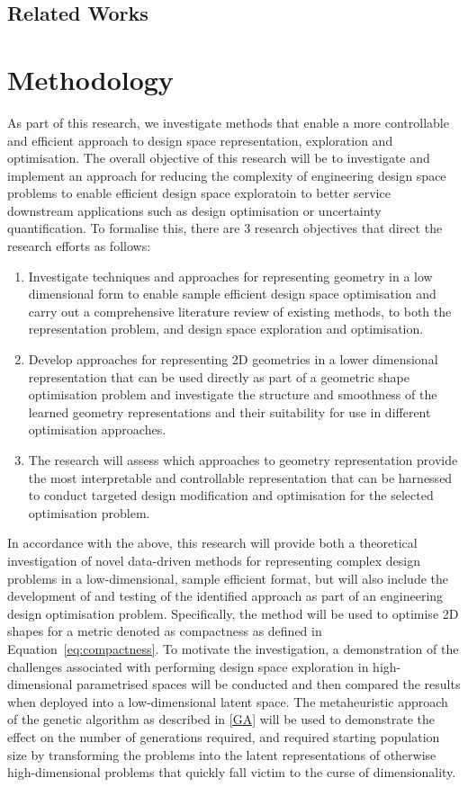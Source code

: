\documentclass{article}
\begin{document}
\subsection{Related Works}

\newpage

\section{Methodology}
As part of this research, we investigate methods that enable a more controllable and efficient approach to design space representation, exploration and optimisation. The overall objective of this research will be to investigate and implement an approach for reducing the complexity of engineering design space problems to enable efficient design space exploratoin to better service downstream applications such as design optimisation or uncertainty quantification. To formalise this, there are 3 research objectives that direct the research efforts as follows:
\begin{enumerate}
    \item Investigate techniques and approaches for representing geometry in a low dimensional form to enable sample efficient design space optimisation and carry out a comprehensive literature review of existing methods, to both the representation problem, and design space exploration and optimisation.
    \item Develop approaches for representing 2D geometries in a lower dimensional representation that can be used directly as part of a geometric shape optimisation problem and investigate the structure and smoothness of the learned geometry representations and their suitability for use in different optimisation approaches.
    \item The research will assess which approaches to geometry representation provide the most interpretable and controllable representation that can be harnessed to conduct targeted design modification and optimisation for the selected optimisation problem.
\end{enumerate}

In accordance with the above, this research will provide both a theoretical investigation of novel data-driven methods for representing complex design problems in a low-dimensional, sample efficient format, but will also include the development of and testing of the identified approach as part of an engineering design optimisation problem. Specifically, the method will be used to optimise 2D shapes for a metric denoted as compactness as defined in Equation~\eqref{eq:compactness}. To motivate the investigation, a demonstration of the challenges associated with performing design space exploration in high-dimensional parametrised spaces will be conducted and then compared the results when deployed into a low-dimensional latent space. The metaheuristic approach of the genetic algorithm as described in \ref{GA} will be used to demonstrate the effect on the number of generations required, and required starting population size by transforming the problems into the latent representations of otherwise high-dimensional problems that quickly fall victim to the curse of dimensionality.
\end{document}
